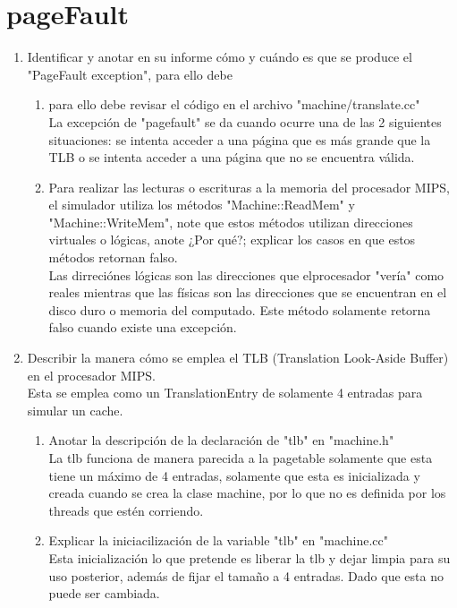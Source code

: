 \documentclass[11pt]{article}
\begin{document}
  \section{pageFault}
  \begin{enumerate}
    \item    Identificar y anotar en su informe cómo y cuándo es que se produce el "PageFault exception", para ello debe
    
    \begin{enumerate}
      \item para ello debe revisar el código en el archivo "machine/translate.cc" \\
      La excepción de "pagefault" se da cuando ocurre una de las 2 siguientes situaciones: se intenta acceder a una página que es más grande que la TLB o se intenta acceder a una página que no se encuentra válida.
      
      \item Para realizar las lecturas o escrituras a la memoria del procesador MIPS, el simulador utiliza los métodos "Machine::ReadMem" y "Machine::WriteMem", note que estos métodos utilizan direcciones virtuales o lógicas, anote ¿Por qué?; explicar los casos en que estos métodos retornan falso. \\
    Las dirreciónes lógicas son las direcciones que elprocesador "vería" como reales mientras que las físicas son las direcciones que se encuentran en el disco duro o memoria del computado. Este método solamente retorna falso cuando existe una excepción.
    \end{enumerate}
    \item Describir la manera cómo se emplea el TLB (Translation Look-Aside Buffer) en el procesador MIPS.\\
            Esta se emplea como un TranslationEntry de solamente 4 entradas para simular un cache. 
          
    \begin{enumerate}     
      \item Anotar la descripción de la declaración de "tlb" en "machine.h"\\
            La tlb funciona de manera parecida a la pagetable solamente que esta tiene un máximo de 4 entradas, solamente que esta es inicializada  y creada cuando se crea la clase machine, por lo que no es definida por los threads que estén corriendo.
            
      \item Explicar la iniciacilización de la variable "tlb" en "machine.cc"\\
            Esta inicialización lo que pretende es liberar la tlb y dejar limpia para su uso posterior, además de fijar el tamaño a 4 entradas. Dado que esta no puede ser cambiada.
            

\end{enumerate}
\end{enumerate}
\end{document}
